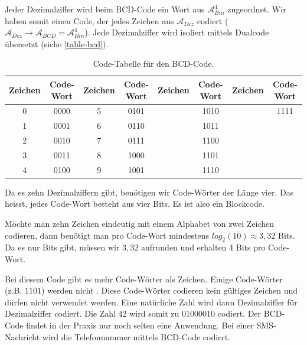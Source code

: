 Jeder Dezimalziffer wird beim \acf{BCD}-Code ein Wort aus $\mathscr{A}_{Bin}^4$ zugeordnet. Wir haben somit einen Code, der jedes Zeichen aus $\mathscr{A}_{Dez}$ codiert ($\mathscr{A}_{Dez} \rightarrow \mathscr{A}_{BCD} = \mathscr{A}_{Bin}^4$). Jede Dezimalziffer wird isoliert mittels Dualcode übersetzt (siehe \autoref{table-bcd}).

\begin{table}[htb]
\centering
\begin{tabular}{|c|c|c|c|c|c|c|c|}
\hline
Zeichen & Code-Wort & Zeichen & Code-Wort & Zeichen & Code-Wort & Zeichen & Code-Wort \\ \hline
0       &   0000        & 5       &   0101        &         &  1010   &         &  1111      \\ \hline
1       &   0001        & 6       &   0110        &         &  1011   & &     \\ \hline
2       &   0010        & 7       &   0111        &         &  1100    & &     \\ \hline
3       &   0011        & 8       &   1000        &         &  1101    & &    \\ \hline
4       &   0100        & 9       &   1001        &         &  1110    & &     \\ \hline
\end{tabular}
\caption{Code-Tabelle für den \ac{BCD}-Code.}
\label{table-bcd}
\end{table}

Da es zehn Dezimalziffern gibt, benötigen wir Code-Wörter der Länge vier. Das heisst, jedes Code-Wort besteht aus vier Bits. Es ist also ein Blockcode.

\begin{hinweis}
Möchte man zehn Zeichen eindeutig mit einem Alphabet von zwei Zeichen codieren, dann benötigt man pro Code-Wort mindestens $log_2(10) \approx 3,32$ Bits. Da es nur  Bits gibt, müssen wir $3,32$ aufrunden und erhalten 4 Bits pro Code-Wort.
\end{hinweis}

Bei diesem Code gibt es mehr Code-Wörter als Zeichen. Einige Code-Wörter (z.B. $1101$) werden nicht . Diese Code-Wörter codieren kein gültiges Zeichen und dürfen nicht verwendet werden. Eine natürliche Zahl wird dann Dezimalziffer für Dezimalziffer codiert. Die Zahl $42$ wird somit zu $01000010$ codiert. Der \ac{BCD}-Code findet in der Praxis nur noch selten eine Anwendung. Bei einer \ac{SMS}-Nachricht wird die Telefonnummer mittels \ac{BCD}-Code codiert.

